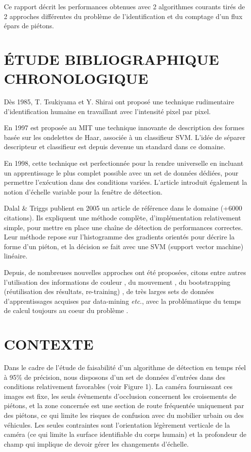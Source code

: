 \documentclass{article}
\begin{document}
	Ce rapport décrit les performances obtenues avec 2 algorithmes courants tirés de 2 approches différentes du problème de l'identification et du comptage d'un flux épars de piétons.

\section{\'{E}TUDE BIBLIOGRAPHIQUE CHRONOLOGIQUE}
\label{sec:bib}

	Dès 1985, T. Tsukiyama et Y. Shirai \cite{TV} ont proposé une technique rudimentaire d'identification humaine en travaillant avec l'intensité pixel par pixel.

	En 1997 est proposée au MIT \cite{Wavelet} une technique innovante de description des formes basée sur les ondelettes de Haar, associée à un classifieur SVM. L'idée de séparer descripteur et classifieur est depuis devenue un standard dans ce domaine.

	En 1998, cette technique est perfectionnée \cite{trainableDet} pour la rendre universelle en incluant un apprentissage le plus complet possible avec un set de données dédiées, pour permettre l'exécution dans des conditions variées. L'article introduit également la notion d'échelle variable pour la fenêtre de détection.

	Dalal \& Triggs \cite{HOG} publient en 2005 un article de référence dans le domaine (+6000 citations). Ils expliquent une méthode complète, d'implémentation relativement simple, pour mettre en place une chaîne de détection de performances correctes. Leur méthode repose sur l'histogramme des gradients orientés pour décrire la forme d'un piéton, et la décision se fait avec une SVM (support vector machine) linéaire.

	Depuis, de nombreuses nouvelles approches ont été proposées, citons entre autres l'utilisation des informations de couleur \cite{NewPedDet}, du mouvement \cite{VJones}, du bootstrapping (réutilisation des résultats, re-training) \cite{NewPedDet}, de très larges sets de données d'apprentissages acquises par data-mining \cite{FeatMining}  \textit{etc.}, avec la problématique du temps de calcul toujours au coeur du problème \cite{cowboy}.


\section{CONTEXTE}
\label{sec:contexte}

	Dans le cadre de l'étude de faisabilité d'un algorithme de détection en temps réel à 95\% de précision, nous disposons d'un set de données d'entrées dans des conditions relativement favorables (voir Figure 1). La caméra fournissant ces images est fixe, les seuls évènements d'occlusion concernent les croisements de piétons, et la zone concernée est une section de route fréquentée uniquement par des piétons, ce qui limite les risques de confusion avec du mobilier urbain ou des véhicules. Les seules contraintes sont l'orientation légèrement verticale de la caméra (ce qui limite la surface identifiable du corps humain) et la profondeur de champ qui implique de devoir gérer les changements d'échelle.
	
\end{document}

